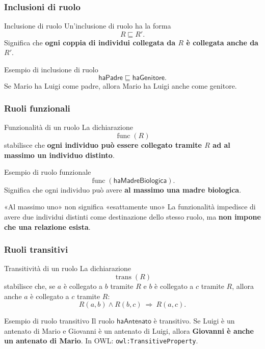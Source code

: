 \subsubsection{Inclusioni di ruolo}

\begin{definition}{Inclusione di ruolo}
    Un'inclusione di ruolo ha la forma
    \[
        R\sqsubseteq R'.
    \]
    Significa che \textbf{ogni coppia di individui collegata da \(R\) è
    collegata anche da \(R'\)}.
\end{definition}
\begin{observation}{Esempio di inclusione di ruolo}
    \[
        \mathsf{haPadre}\sqsubseteq\mathsf{haGenitore}.
    \]
    Se Mario ha Luigi come padre, allora Mario ha Luigi anche come genitore.
\end{observation}

\subsubsection{Ruoli funzionali}

\begin{definition}{Funzionalità di un ruolo}
    La dichiarazione
    \[
        \operatorname{func}(R)
    \]
    stabilisce che \textbf{ogni individuo può essere collegato tramite \(R\)
    ad al massimo un individuo distinto}.
\end{definition}
\begin{observation}{Esempio di ruolo funzionale}
    \[
        \operatorname{func}(\mathsf{haMadreBiologica}).
    \]
    Significa che ogni individuo può avere \textbf{al massimo una madre biologica}.
\end{observation}
\begin{warning}{«Al massimo uno» non significa «esattamente uno»}
    La funzionalità impedisce di avere due individui distinti come destinazione
    dello stesso ruolo, ma \textbf{non impone che una relazione esista}.
\end{warning}


\subsubsection{Ruoli transitivi}

\begin{definition}{Transitività di un ruolo}
    La dichiarazione
    \[
        \operatorname{trans}(R)
    \]
    stabilisce che, se \(a\) è collegato a \(b\) tramite \(R\) e \(b\) è
    collegato a \(c\) tramite \(R\), allora anche \(a\) è collegato a \(c\)
    tramite \(R\):
    \[
        R(a,b)\land R(b,c)\ \Rightarrow\ R(a,c).
    \]
\end{definition}
\begin{observation}{Esempio di ruolo transitivo}
    Il ruolo \(\mathsf{haAntenato}\) è transitivo. Se Luigi è un antenato di
    Mario e Giovanni è un antenato di Luigi, allora \textbf{Giovanni è anche
    un antenato di Mario}. In OWL: \texttt{owl:TransitiveProperty}.
\end{observation}

